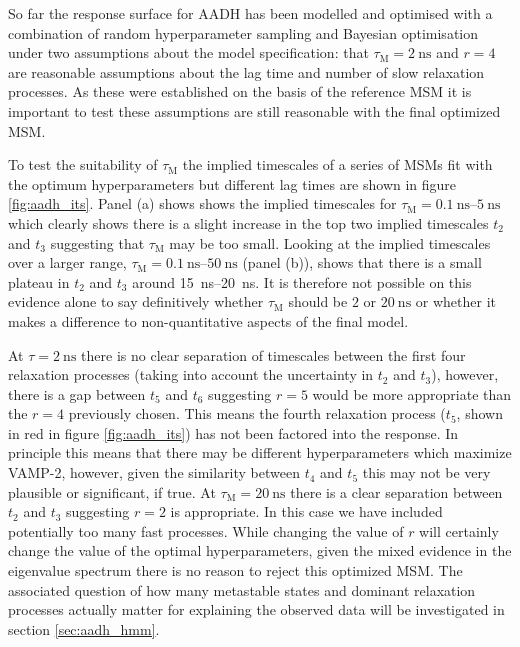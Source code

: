 So far the response surface for AADH has been modelled and optimised with a combination of random hyperparameter sampling and Bayesian optimisation under two assumptions about the model specification: that $\tau_{\mathrm{M}} = \SI{2}{\nano\second}$ and $r=4$ are reasonable assumptions about the lag time and number of slow relaxation processes. As these were established on the basis of the reference MSM it is important to test these assumptions are still reasonable with the final optimized MSM. 

To test the suitability of $\tau_{\mathrm{M}}$ the implied timescales of a series of MSMs fit with the optimum hyperparameters but different lag times are shown in figure \ref{fig:aadh_its}. Panel (a) shows shows the implied timescales for $\tau_{\mathrm{M}} = \SIrange[range-phrase=\text{--}]{0.1}{5}{\nano\second}$ which clearly shows there is a slight increase in the top two implied timescales $t_{2}$ and $t_{3}$ suggesting that $\tau_{\mathrm{M}}$ may be too small. Looking at the implied timescales over a larger range, $\tau_{\mathrm{M}} = \SIrange[range-phrase=\text{--}]{0.1}{50}{\nano\second}$ (panel (b)), shows that there is a small plateau in $t_{2}$ and $t_{3}$  around  \SIrange{15}{20}{\nano\second}. It is therefore not possible on this evidence alone to say definitively whether $\tau_{\mathrm{M}}$ should be $2$ or $\SI{20}{\nano\second}$ or whether it makes a difference to non-quantitative aspects of the final model.  

At $\tau = \SI{2}{\nano\second}$ there is no clear separation of timescales between the first four relaxation processes (taking into account the uncertainty in $t_{2}$ and $t_{3}$), however, there is a gap between $t_{5}$ and $t_{6}$ suggesting $r=5$ would be more appropriate than the $r=4$ previously chosen. This means the fourth relaxation process ($t_{5}$, shown in red in figure \ref{fig:aadh_its}) has not been factored into the response. In principle this means that there may be different hyperparameters which maximize VAMP-2, however, given the similarity between $t_{4}$ and $t_{5}$ this may not be very plausible or significant, if true. At $\tau_{\mathrm{M}} = \SI{20}{\nano\second}$ there is a clear separation between $t_{2}$ and $t_{3}$ suggesting $r=2$ is appropriate. In this case we have included potentially too many fast processes. While changing the value of $r$ will certainly change the value of the optimal hyperparameters, given the mixed evidence in the eigenvalue spectrum there is no reason to reject this optimized MSM. The associated question of how many metastable states and dominant relaxation processes actually matter for explaining the observed data will be investigated in section \ref{sec:aadh_hmm}. 

